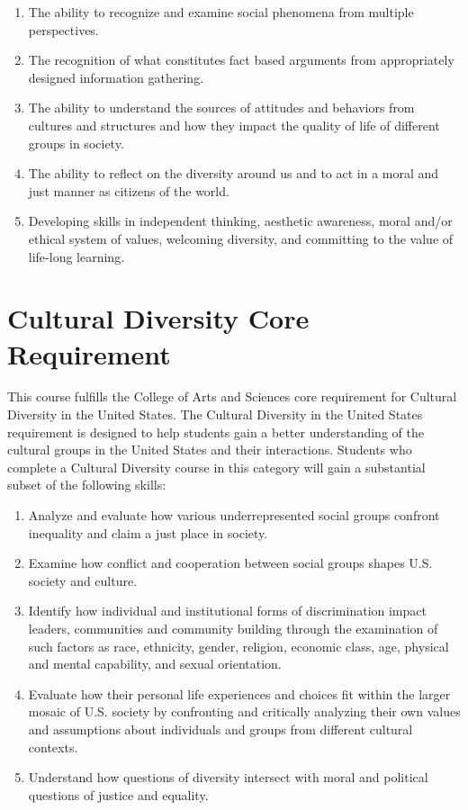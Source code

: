 \documentclass[]{book}
\theoremstyle{definition}
\theoremstyle{definition}
\theoremstyle{definition}
\theoremstyle{remark}
\begin{document}
\begin{enumerate}
\def\labelenumi{\arabic{enumi}.}
\item
  The ability to recognize and examine social phenomena from multiple
  perspectives.
\item
  The recognition of what constitutes fact based arguments from
  appropriately designed information gathering.
\item
  The ability to understand the sources of attitudes and behaviors from
  cultures and structures and how they impact the quality of life of
  different groups in society.
\item
  The ability to reflect on the diversity around us and to act in a
  moral and just manner as citizens of the world.
\item
  Developing skills in independent thinking, aesthetic awareness, moral
  and/or ethical system of values, welcoming diversity, and committing
  to the value of life-long learning.
\end{enumerate}

\hypertarget{cultural-diversity-core-requirement}{%
\section{Cultural Diversity Core
Requirement}\label{cultural-diversity-core-requirement}}

This course fulfills the College of Arts and Sciences core requirement
for Cultural Diversity in the United States. The Cultural Diversity in
the United States requirement is designed to help students gain a better
understanding of the cultural groups in the United States and their
interactions. Students who complete a Cultural Diversity course in this
category will gain a substantial subset of the following skills:

\begin{enumerate}
\def\labelenumi{\arabic{enumi}.}
\item
  Analyze and evaluate how various underrepresented social groups
  confront inequality and claim a just place in society.
\item
  Examine how conflict and cooperation between social groups shapes U.S.
  society and culture.
\item
  Identify how individual and institutional forms of discrimination
  impact leaders, communities and community building through the
  examination of such factors as race, ethnicity, gender, religion,
  economic class, age, physical and mental capability, and sexual
  orientation.
\item
  Evaluate how their personal life experiences and choices fit within
  the larger mosaic of U.S. society by confronting and critically
  analyzing their own values and assumptions about individuals and
  groups from different cultural contexts.
\item
  Understand how questions of diversity intersect with moral and
  political questions of justice and equality.
\end{enumerate}
\end{document}
